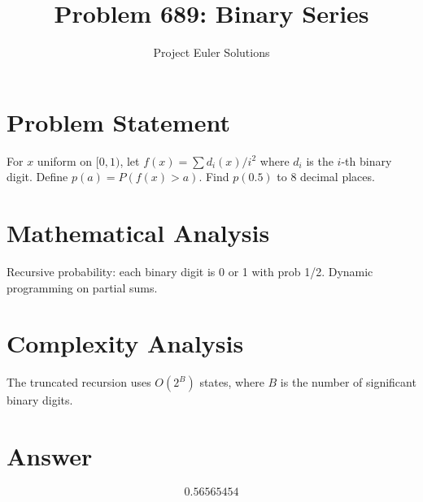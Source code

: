 \documentclass[11pt]{article}
\title{Problem 689: Binary Series}
\author{Project Euler Solutions}
\date{}
\begin{document}
\maketitle

\section{Problem Statement}

For $x$ uniform on $[0,1)$, let $f(x)=\sum d_i(x)/i^2$ where $d_i$ is the $i$-th binary digit. Define $p(a)=P(f(x)>a)$. Find $p(0.5)$ to 8 decimal places.

\section{Mathematical Analysis}

Recursive probability: each binary digit is 0 or 1 with prob 1/2. Dynamic programming on partial sums.

\section{Complexity Analysis}

The truncated recursion uses $O(2^B)$ states, where $B$ is the number of significant binary digits.

\section{Answer}

\[
\boxed{0.56565454}
\]
\end{document}
